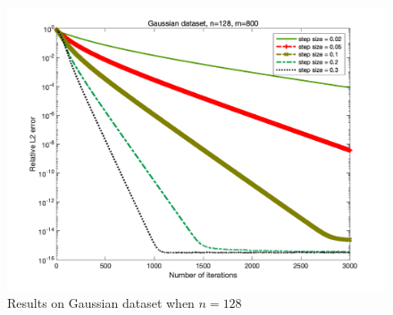 \documentclass{article}
\begin{document}
\begin{figure}
\begin{minipage}{0.33\linewidth}
			\includegraphics[width=1\linewidth]{./fig/gaussian+23.png}
			\caption{$m=1200$}
		\end{minipage}
		\caption*{Results on Gaussian dataset when $n=128$}
	\end{figure}
\end{document}
